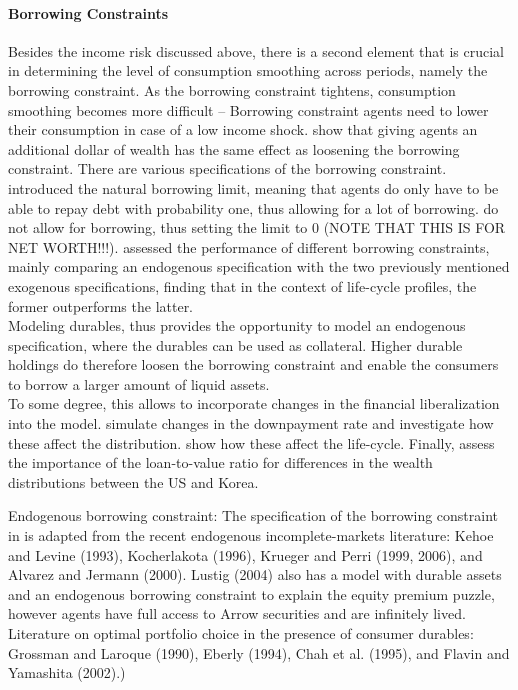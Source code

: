 \documentclass[a4paper,12pt]{article}
\begin{document}
\paragraph{Borrowing Constraints} 
Besides the income risk discussed above, there is a second element that is crucial in determining the level of consumption smoothing across periods, namely the borrowing constraint. As the borrowing constraint tightens, consumption smoothing becomes more difficult \--- Borrowing constraint agents need to lower their consumption in case of a low income shock. \cite{ljungqvist2012recursive} show that giving agents an additional dollar of wealth has the same effect as loosening the borrowing constraint. There are various specifications of the borrowing constraint. \cite{aiyagari1994} introduced the natural borrowing limit, meaning that agents do only have to be able to repay debt with probability one, thus allowing for a lot of borrowing. \cite{hintermaier2011} do not allow for borrowing, thus setting the limit to 0 (NOTE THAT THIS IS FOR NET WORTH!!!). \citep{FV&K2011} assessed the performance of different borrowing constraints, mainly comparing an endogenous specification with the two previously mentioned exogenous specifications, finding that in the context of life-cycle profiles, the former outperforms the latter. \\
Modeling durables, thus provides the opportunity to model an endogenous specification, where the durables can be used as collateral. Higher durable holdings do therefore loosen the borrowing constraint and enable the consumers to borrow a larger amount of liquid assets. \\ To some degree, this allows to incorporate changes in the financial liberalization into the model. \cite{diaz2010} simulate changes in the downpayment rate and investigate how these affect the distribution. \cite{yang2009} show how these affect the life-cycle. Finally, \cite{cho2012accounting} assess the importance of the loan-to-value ratio for differences in the wealth distributions between the US and Korea. 

Endogenous borrowing constraint: The specification of the borrowing constraint  in \cite{FV&K2011} is adapted from the recent endogenous incomplete-markets literature: Kehoe and Levine (1993), Kocherlakota (1996), Krueger and Perri (1999, 2006), and Alvarez and Jermann (2000). Lustig (2004) also has a model with durable assets and an endogenous borrowing constraint to explain the equity premium puzzle, however agents have full access to Arrow securities and are infinitely lived.
Literature on optimal portfolio choice in the presence of consumer durables: Grossman and Laroque (1990), Eberly (1994), Chah et al. (1995), and Flavin and Yamashita (2002).)
\end{document}
